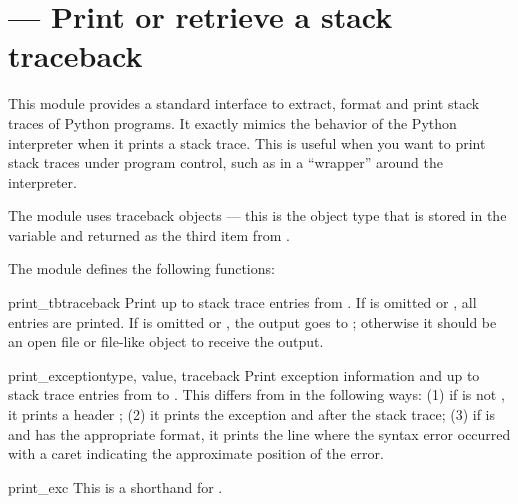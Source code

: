 \section{ ---
         Print or retrieve a stack traceback}



This module provides a standard interface to extract, format and print
stack traces of Python programs.  It exactly mimics the behavior of
the Python interpreter when it prints a stack trace.  This is useful
when you want to print stack traces under program control, such as in a
``wrapper'' around the interpreter.

The module uses traceback objects --- this is the object type that is
stored in the  variable and returned
as the third item from .

The module defines the following functions:

\begin{funcdesc}{print_tb}{traceback}
Print up to  stack trace entries from .  If
 is omitted or , all entries are printed.
If  is omitted or , the output goes to
; otherwise it should be an open file or file-like
object to receive the output.
\end{funcdesc}

\begin{funcdesc}{print_exception}{type, value, traceback}
Print exception information and up to  stack trace entries
from  to .
This differs from  in the
following ways: (1) if  is not , it prints a
header ; (2) it prints the
exception  and  after the stack trace; (3) if
 is  and  has the
appropriate format, it prints the line where the syntax error occurred
with a caret indicating the approximate position of the error.
\end{funcdesc}

\begin{funcdesc}{print_exc}{}
This is a shorthand for .
\end{funcdesc}

